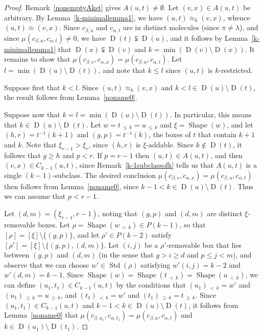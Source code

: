 \documentclass[10pt]{amsart}
\theoremstyle{definition}
\newcommand{\lessthan}[2]{#1\,{_{<\,#2}}}
\newcommand{\Lessthan}[2]{#1\,{_{\leqslant\,#2}}}
\newcommand{\Morethan}[2]{#1\,{_{\geqslant\,#2}}}
\DeclareMathOperator{\STD}{Std}
\DeclareMathOperator{\shape}{Shape}
\DeclareMathOperator{\D}{D}
\begin{document}
\begin{proof}
Remark~\ref{nonemptyAkst} gives $A(u,t)\neq\emptyset$. Let
$(v,x)\in A(u,t)$ be arbitrary. By Lemma~\ref{k-minimallemma1}, we have
$(u,t)\approx_k (v,x)$, whence $(u,t)\approx (v,x)$. Since $c_{\beta,u}$
and $c_{\alpha,t}$ are in distinct molecules (since $\pi\neq\lambda$),
and since $\mu(c_{\beta,u},c_{\alpha,t}) \neq 0$, we have $\D(t)\subsetneqq\D(u)$,
and it follows by Lemma~\ref{k-minimallemma1}
that $\D(x)\subsetneqq\D(v)$ and $k=\min(\D(v)\setminus\D(x))$.
It remains to show that
$\mu(c_{\beta,v},c_{\alpha,x})=\mu(c_{\beta,u},c_{\alpha,t})$.
Let $l=\min(\D(u)\setminus\D(t))$, and note that $k\leqslant l$
since $(u,t)$ is $k$-restricted.

Suppose first that $k<l$. Since $(u,t)\approx_k (v,x)$ and
$k<l\in\D(u)\setminus\D(t)$, the result follows from Lemma~\ref{noname0}.

Suppose now that $k=l=\min(\D(u)\setminus\D(t))$. In particular,
this means that $k\in\D(u)\setminus\D(t)$. Let $w=\Lessthan tk=\Lessthan uk$
and $\xi=\shape(w)$, and let $(h,r)=t^{-1}(k+1)$ and $(g,p)=t^{-1}(k)$,
the boxes of $t$ that contain $k+1$ and $k$. Note that $\xi_{r-1}>\xi_r$,
since $(h,r)$ is $\xi$-addable. Since $k\notin\D(t)$, it follows that
$g\geqslant h$ and $p<r$. If $p=r-1$ then $(u,t)\in A(u,t)$, and then
$(v,x)\in C_{k-1}(u,t)$, since Remark~\ref{k-1subclassofk} tells us that $A(u,t)$
is a single $(k-1)$-subclass. The desired conclusion
$\mu(c_{\beta,v},c_{\alpha,x})=\mu(c_{\beta,u},c_{\alpha,t})$
then follows from Lemma~\ref{noname0}, since $k-1<k\in\D(u)\setminus\D(t)$.
Thus we can assume that $p<r-1$.

Let $(d,m)=(\xi_{r-1},r-1)$, noting that $(g,p)$ and $(d,m)$ are distinct
$\xi$-removable boxes. Let $\rho=\shape(\lessthan wk)\in P(k-1)$, so that
$[\rho]=[\xi]\setminus \{(g,p)\}$, and let $\rho'\in P(k-2)$ satisfy
$[\rho']=[\xi]\setminus \{(g,p),(d,m)\}$. Let $(i,j)$ be a
$\rho'$-removable box that lies between $(g,p)$ and $(d,m)$
(in the sense that $g>i\geqslant d$ and $p\leqslant j<m$), and observe
that we can choose $w'\in\STD(\rho)$ satisfying $w'(i,j)=k-2$ and $w'(d,m)=k-1$.
Since $\shape(w)=\shape(\lessthan tk)=\shape(\lessthan uk)$, we can
define $(u_1,t_1)\in C_{k-1}(u,t)$ by the conditions that
$\lessthan {(u_1)}k = w'$ and $\Morethan {(u_1)}k = \Morethan {u}k$,
and $\lessthan {(t_1)}k = w'$ and $\Morethan {(t_1)}k = \Morethan tk$.
Since $(u_1,t_1)\in C_{k-1}(u,t)$ and $k-1<k\in\D(u)\setminus\D(t)$, it follows
from Lemma~\ref{noname0} that
$\mu(c_{\beta,u_1},c_{\alpha,t_1})=\mu(c_{\beta,u},c_{\alpha,t})$ and
$k\in\D(u_1)\setminus\D(t_1)$.


\end{proof}
\end{document}
